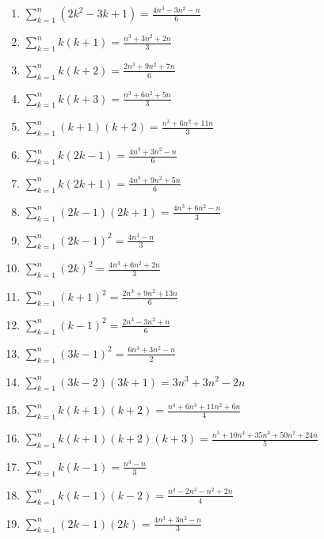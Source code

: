 \documentclass[11pt,a4paper]{article}
\begin{document}
\begin{enumerate}
\item $\displaystyle \sum_{k=1}^{n} \left(2k^{2} - 3k + 1\right) = \frac{4n^{3} - 3n^{2} - n}{6}$
\item $\displaystyle \sum_{k=1}^{n} k\left(k + 1\right) = \frac{n^{3} + 3n^{2} + 2n}{3}$
\item $\displaystyle \sum_{k=1}^{n} k\left(k + 2\right) = \frac{2n^{3} + 9n^{2} + 7n}{6}$
\item $\displaystyle \sum_{k=1}^{n} k\left(k + 3\right) = \frac{n^{3} + 6n^{2} + 5n}{3}$
\item $\displaystyle \sum_{k=1}^{n} \left(k + 1\right)\left(k + 2\right) = \frac{n^{3} + 6n^{2} + 11n}{3}$
\item $\displaystyle \sum_{k=1}^{n} k\left(2k - 1\right) = \frac{4n^{3} + 3n^{2} - n}{6}$
\item $\displaystyle \sum_{k=1}^{n} k\left(2k + 1\right) = \frac{4n^{3} + 9n^{2} + 5n}{6}$
\item $\displaystyle \sum_{k=1}^{n} \left(2k - 1\right)\left(2k + 1\right) = \frac{4n^{3} + 6n^{2} - n}{3}$
\item $\displaystyle \sum_{k=1}^{n} \left(2k - 1\right)^{2} = \frac{4n^{3} - n}{3}$
\item $\displaystyle \sum_{k=1}^{n} \left(2k\right)^{2} = \frac{4n^{3} + 6n^{2} + 2n}{3}$
\item $\displaystyle \sum_{k=1}^{n} \left(k + 1\right)^{2} = \frac{2n^{3} + 9n^{2} + 13n}{6}$
\item $\displaystyle \sum_{k=1}^{n} \left(k - 1\right)^{2} = \frac{2n^{3} - 3n^{2} + n}{6}$
\item $\displaystyle \sum_{k=1}^{n} \left(3k - 1\right)^{2} = \frac{6n^{3} + 3n^{2} - n}{2}$
\item $\displaystyle \sum_{k=1}^{n} \left(3k - 2\right)\left(3k + 1\right) = 3n^{3} + 3n^{2} - 2n$
\item $\displaystyle \sum_{k=1}^{n} k\left(k + 1\right)\left(k + 2\right) = \frac{n^{4} + 6n^{3} + 11n^{2} + 6n}{4}$
\item $\displaystyle \sum_{k=1}^{n} k\left(k + 1\right)\left(k + 2\right)\left(k + 3\right) = \frac{n^{5} + 10n^{4} + 35n^{3} + 50n^{2} + 24n}{5}$
\item $\displaystyle \sum_{k=1}^{n} k\left(k - 1\right) = \frac{n^{3} - n}{3}$
\item $\displaystyle \sum_{k=1}^{n} k\left(k - 1\right)\left(k - 2\right) = \frac{n^{4} - 2n^{3} - n^{2} + 2n}{4}$
\item $\displaystyle \sum_{k=1}^{n} \left(2k - 1\right)\left(2k\right) = \frac{4n^{3} + 3n^{2} - n}{3}$

\end{enumerate}
\end{document}
